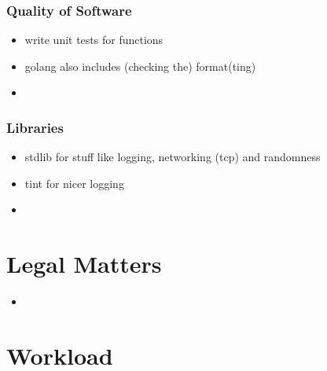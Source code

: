 \documentclass[a4paper,english,10pt,NET]{tumarticle}
\begin{document}
\subsubsection{Quality of Software}
\begin{itemize}
	\item write unit tests for functions
	\item golang also includes (checking the) format(ting)
	\item {}
\end{itemize}

\subsubsection{Libraries}
\begin{itemize}
	\item stdlib for stuff like logging, networking (tcp) and randomness 
	\item tint for nicer logging
	\item {}
\end{itemize}

\section{Legal Matters}
\begin{itemize}
	\item {}
\end{itemize}

\section{Workload}

\todos
\end{document}
